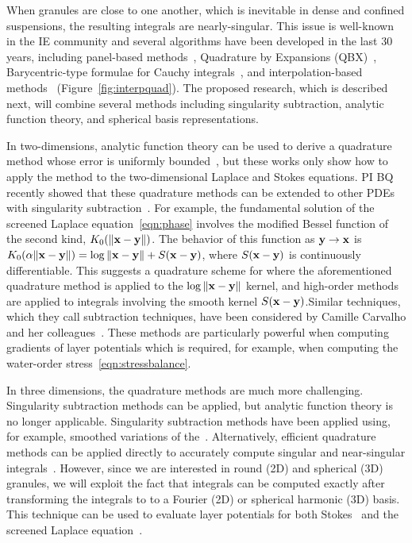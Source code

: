When granules are close to one another, which is inevitable in dense and
confined suspensions, the resulting integrals are nearly-singular. This
issue is well-known in the IE community and several algorithms have been
developed in the last 30 years, including panel-based
methods~\cite{helsing_2008a, helsing_tutorial_2012}, Quadrature by
Expansions (QBX)~\cite{din-hua-mar-tan2021, klo-bar-gre-one2013,
ste-bar2022, af2018sisc}, Barycentric-type formulae for Cauchy
integrals~\cite{bar2014, bar-wu-vee2015, ioa-pap-per1991}, and
interpolation-based methods~\cite{ying_2006, qua-bir2014,
rah-vee-zor-bir2015} (Figure~\ref{fig:interpquad}). The proposed
research, which is described next, will combine several methods
including singularity subtraction, analytic function theory, and
spherical basis representations.

In two-dimensions, analytic function theory can be used to derive a
quadrature method whose error is uniformly bounded~\cite{bar2014,
bar-wu-vee2015, ioa-pap-per1991}, but these works only show how to apply
the method to the two-dimensional Laplace and Stokes equations. PI BQ
recently showed that these quadrature methods can be extended to other
PDEs with singularity subtraction~\cite{che-lin-her-qua2022}. For
example, the fundamental solution of the screened Laplace
equation~\eqref{eqn:phase} involves the modified Bessel function of the
second kind, $K_0(\|\mathbf{x} - \mathbf{y}\|)$. The behavior of this function as $\mathbf{y}
\rightarrow \mathbf{x}$ is $K_0(\alpha \|\mathbf{x} - \mathbf{y}\|) = \log\|\mathbf{x} - \mathbf{y}\| +
S(\mathbf{x} - \mathbf{y})$, where $S(\mathbf{x} - \mathbf{y})$ is continuously differentiable. This
suggests a quadrature scheme for where the aforementioned quadrature
method is applied to the $\log\|\mathbf{x} - \mathbf{y}\|$ kernel, and high-order
methods~\cite{tre-wei2014} are applied to integrals involving the smooth
kernel $S(\mathbf{x} - \mathbf{y})$.Similar techniques, which they call subtraction
techniques, have been considered by Camille Carvalho and her
colleagues~\cite{car2021, car2020, car-kha-kim2018}. These methods are
particularly powerful when computing gradients of layer potentials which
is required, for example, when computing the water-order
stress~\eqref{eqn:stressbalance}.

In three dimensions, the quadrature methods are much more challenging.
Singularity subtraction methods can be applied, but analytic function
theory is no longer applicable. Singularity subtraction methods have
been applied using, for example, smoothed variations of
the~\cite{beale1, cor2001, tlu-bea2019}. Alternatively, efficient
quadrature methods can be applied directly to accurately compute
singular and near-singular integrals~\cite{khayat_2005,
gimbutas2013sisc}. However, since we are interested in round (2D) and
spherical (3D) granules, we will exploit the fact that integrals can be
computed exactly after transforming the integrals to to a Fourier (2D)
or spherical harmonic (3D) basis. This technique can be used to evaluate
layer potentials for both Stokes~\cite{cor-vee2018} and the screened
Laplace equation~\cite{koh-cor-che-vee2021}.

